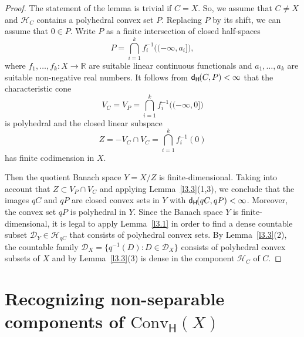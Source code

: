\documentclass{amsart}
\newcommand{\IR}{\mathbb R}
\newcommand{\e}{\varepsilon}
\newcommand{\Conv}{\mathrm{Conv}}
\newcommand{\HH}{\mathcal H}
\newcommand{\dH}{\mathsf{d}_{\mathsf H}\kern-1pt}
\newcommand{\ConvH}{\Conv_{\mathsf H}}
\theoremstyle{definition}
\begin{document}
\begin{proof} The statement of the lemma is trivial if $C=X$. So, we assume that $C\ne X$ and $\HH_C$ contains a polyhedral convex set $P$. Replacing $P$ by its shift, we can assume that $0\in P$. Write $P$ as a finite intersection of closed half-spaces
$$P=\bigcap_{i=1}^kf_i^{-1}\big((-\infty,a_i]\big),$$
where $f_1,\dots,f_k:X\to\IR$ are suitable linear continuous functionals and $a_1,\dots,a_k$ are suitable non-negative real numbers. It follows from $\dH(C,P)<\infty$ that the characteristic cone $$V_C=V_P=\bigcap_{i=1}^kf_i^{-1}\big((-\infty,0]\big)$$
is polyhedral and the closed linear subspace
$$Z=-V_C\cap V_C=\bigcap_{i=1}^kf_i^{-1}(0)$$has finite codimension in $X$.

Then the quotient Banach space $Y=X/Z$ is finite-dimensional. Taking into account that $Z\subset V_P\cap V_C$ and applying Lemma~\ref{l3.3}(1,3), we conclude that the images $qC$ and $qP$ are closed convex sets in $Y$ with $\dH(qC,qP)<\infty$. Moreover, the convex set $qP$ is polyhedral in $Y$. Since the Banach space $Y$ is finite-dimensional, it is legal to apply Lemma~\ref{l3.1} in order to find a dense countable subset $\mathcal D_Y\in\HH_{qC}$ that consists of polyhedral convex sets. By Lemma~\ref{l3.3}(2), the countable family $\mathcal D_X=\{q^{-1}(D):D\in\mathcal D_X\}$ consists of polyhedral convex subsets of $X$ and by Lemma~\ref{l3.3}(3) is dense in the component $\HH_C$ of $C$.
\end{proof}

\section{Recognizing non-separable components of $\ConvH(X)$}
\end{document}
